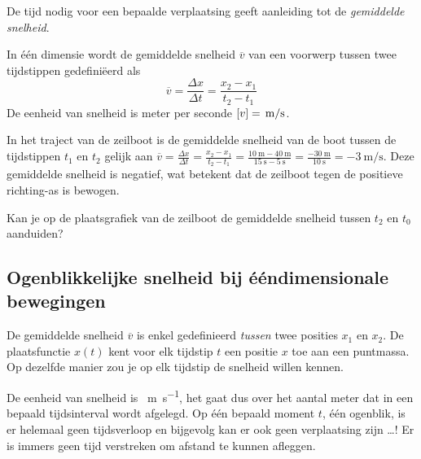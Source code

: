 \documentclass{ximera}
\begin{document}


De tijd nodig voor een bepaalde verplaatsing geeft aanleiding tot de \textit{gemiddelde snelheid}. 


\begin{definition}
	
In één dimensie wordt de gemiddelde snelheid $\overline{v}$ van een voorwerp tussen twee tijdstippen gedefiniëerd als
\[
\overline{v}=\frac{\Delta x}{\Delta t}=\frac{x_2-x_1}{t_2-t_1}
\]
De eenheid van snelheid is meter per seconde $[v]=\rm\,m/s$. 
\end{definition}


In het traject van de zeilboot is de gemiddelde snelheid van de boot tussen de tijdstippen $t_1$ en $t_2$ gelijk aan 
$\overline{v} =\frac{\Delta x}{\Delta t} =\frac{x_2-x_1}{t_2-t_1}=\frac{\SI{10}{\meter} - \SI{40}{\meter}}{\SI{15}{\second} - \SI{5}{\second}}= \frac{\SI{-30}{\meter}}{\SI{10}{\second}} = \SI{-3}{\meter\per\second}$. 
Deze gemiddelde snelheid is negatief, wat betekent dat de zeilboot tegen de positieve richting-as is bewogen. 


\begin{quickquestion*}{}{}
Kan je op de plaatsgrafiek van de zeilboot de gemiddelde snelheid tussen \(t_2\) en \(t_0\) aanduiden? 
\end{quickquestion*}



\subsection*{Ogenblikkelijke snelheid bij ééndimensionale bewegingen}

De gemiddelde snelheid \(\overline{v}\) is enkel gedefinieerd \textit{tussen} twee posities \(x_1\) en \(x_2\). 
De plaatsfunctie \(x(t)\) kent voor elk tijdstip \(t\) een positie \(x\) toe aan een puntmassa. Op dezelfde manier zou je op elk tijdstip de snelheid willen kennen. 

De eenheid van snelheid is \SI{}{\meter\per\second}, het gaat dus over het aantal meter dat in een bepaald tijds\-in\-ter\-val wordt afgelegd. 
Op één bepaald moment \(t\), één ogenblik, is er helemaal geen tijdsverloop en bijgevolg kan er ook geen verplaatsing zijn \ldots! Er is immers geen tijd verstreken om afstand te kunnen afleggen.
\end{document}
